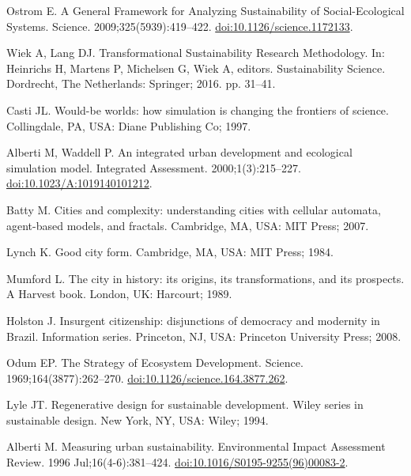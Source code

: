\documentclass[10pt,a4paper]{article}
\begin{document}
\begin{multicols}{2}
\begin{footnotesize}
\begin{thebibliography}{100}
Ostrom E.
\newblock A {General} {Framework} for {Analyzing} {Sustainability} of
  {Social}-{Ecological} {Systems}.
\newblock Science. 2009;325(5939):419--422.
\newblock
  \href{https://doi.org/10.1126/science.1172133}{doi:10.1126/science.1172133}.

Wiek A, Lang DJ.
\newblock Transformational {Sustainability} {Research} {Methodology}.
\newblock In: Heinrichs H, Martens P, Michelsen G, Wiek A, editors.
  Sustainability {Science}. Dordrecht, The Netherlands: Springer; 2016. pp.
  31--41.

Casti JL.
\newblock Would-be worlds: how simulation is changing the frontiers of science.
\newblock Collingdale, PA, USA: Diane Publishing Co; 1997.

Alberti M, Waddell P.
\newblock An integrated urban development and ecological simulation model.
\newblock Integrated Assessment. 2000;1(3):215--227.
\newblock
  \href{https://doi.org/10.1023/A:1019140101212}{doi:10.1023/A:1019140101212}.

Batty M.
\newblock Cities and complexity: understanding cities with cellular automata,
  agent-based models, and fractals.
\newblock Cambridge, MA, USA: MIT Press; 2007.

Lynch K.
\newblock Good city form.
\newblock Cambridge, MA, USA: MIT Press; 1984.

Mumford L.
\newblock The city in history: its origins, its transformations, and its
  prospects.
\newblock A {Harvest} book. London, UK: Harcourt; 1989.

Holston J.
\newblock Insurgent citizenship: disjunctions of democracy and modernity in
  {Brazil}.
\newblock Information series. Princeton, NJ, USA: Princeton University Press;
  2008.

Odum EP.
\newblock The {Strategy} of {Ecosystem} {Development}.
\newblock Science. 1969;164(3877):262--270.
\newblock
  \href{https://doi.org/10.1126/science.164.3877.262}{doi:10.1126/science.164.3877.262}.

Lyle JT.
\newblock Regenerative design for sustainable development.
\newblock Wiley series in sustainable design. New York, NY, USA: Wiley; 1994.

Alberti M.
\newblock Measuring urban sustainability.
\newblock Environmental Impact Assessment Review. 1996 Jul;16(4-6):381--424.
\newblock
  \href{https://doi.org/10.1016/S0195-9255(96)00083-2}{doi:10.1016/S0195-9255(96)00083-2}.


\end{thebibliography}
\end{footnotesize}
\end{multicols}
\end{document}
